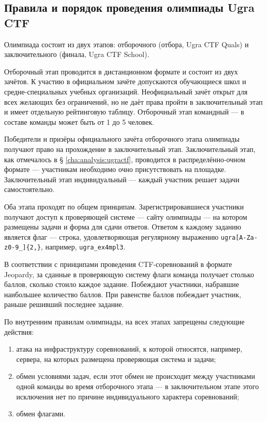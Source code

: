 \subsection{Правила и порядок проведения олимпиады Ugra CTF}
\label{cha:the:rules-and-order}

Олимпиада состоит из двух этапов: отборочного (отбора, Ugra CTF Quals) и заключительного (финала, Ugra CTF School).

Отборочный этап проводится в дистанционном формате и состоит из двух зачётов. К участию в официальном зачёте допускаются обучающиеся школ и средне-специальных учебных организаций. Неофициальный зачёт открыт для всех желающих без ограничений, но не даёт права пройти в заключительный этап и имеет отдельную рейтинговую таблицу. Отборочный этап командный — в составе команды может быть от 1 до 5 человек.

Победители и призёры официального зачёта отборочного этапа олимпиады получают право на прохождение в заключительный этап. Заключительный этап, как отмечалось в § \ref{cha:analysis:ugractf}, проводится в распределённо-очном формате — участникам необходимо очно присутствовать на площадке. Заключительный этап индивидуальный — каждый участник решает задачи самостоятельно.

Оба этапа проходят по общем принципам. Зарегистрировавшиеся участники получают доступ к проверяющей системе — сайту олимпиады — на котором размещены задачи и форма для сдачи ответов. Ответом к каждому заданию является флаг — строка, удовлетворяющая регулярному выражению \texttt{ugra[A-Za-z0-9\_]\{2,\}}, например, \texttt{ugra\_ex4mpl3}.


В соответствии с принципами проведения CTF-соревнований в формате Jeopardy, за сданные в проверяющую систему флаги команда получает столько баллов, сколько стоило каждое задание. Побеждают участники, набравшие наибольшее количество баллов. При равенстве баллов побеждает участник, раньше решивший последнее задание.

По внутренним правилам олимпиады, на всех этапах запрещены следующие действия:
\begin{enumerate}
\item атака на инфраструктуру соревнований, к которой относятся, например, сервера, на которых размещена проверяющая система и задачи;
\item обмен условиями задач, если этот обмен не происходит между участниками одной команды во время отборочного этапа — в заключительном этапе этого исключения нет по причине индивидуального характера соревнований;
\item обмен флагами.
\end{enumerate}

